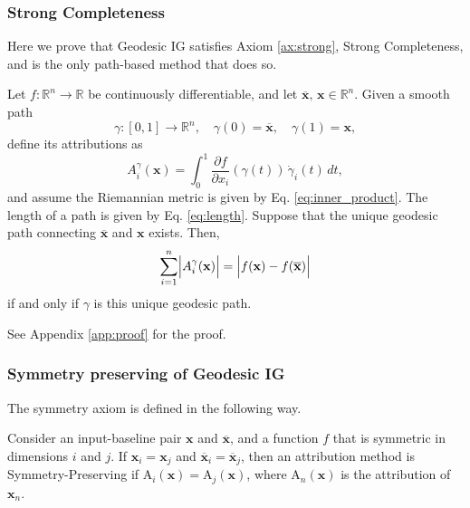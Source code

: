 \subsubsection{Strong Completeness}
\label{sec:strong_comp}

Here we prove that Geodesic IG satisfies Axiom \ref{ax:strong}, Strong Completeness, and is the only path-based method that does so. 

\begin{theorem}
	\label{theo:strong}
	Let \(f:\mathbb{R}^n\to\mathbb{R}\) be continuously differentiable, and let \(\overline{\mathbf{x}},\, \mathbf{x}\in\mathbb{R}^n\). Given a smooth path 
	\[
	\gamma:[0,1]\to\mathbb{R}^n,\quad \gamma(0)=\overline{\mathbf{x}},\quad \gamma(1)=\mathbf{x},
	\]
	define its attributions as
	\begin{equation}
		A_i^{\gamma}(\mathbf{x}) = \int_0^1 \frac{\partial f}{\partial x_i}(\gamma(t))\,\dot{\gamma}_i(t)\,dt,
		\label{eq:attribution}
	\end{equation}
	and assume the Riemannian metric is given by Eq. \ref{eq:inner_product}. 
	The length of a path is given by Eq. \ref{eq:length}. 
	Suppose that the unique geodesic path connecting \(\overline{\mathbf{x}}\) and \(\mathbf{x}\) exists. Then,
	\begin{equation*}
		\sum_{i=1}^n \Bigl| A_i^{\gamma}(\mathbf{x}) \Bigr| = \Bigl| f(\mathbf{x})-f(\overline{\mathbf{x}}) \Bigr|
	\end{equation*}
	if and only if \(\gamma\) is this unique geodesic path.
\end{theorem}


See Appendix \ref{app:proof} for the proof.


\subsubsection{Symmetry preserving of Geodesic IG}

The symmetry axiom is defined in the following way. 
\begin{axiom}
	Consider an input-baseline pair $\textbf{x}$ and $\overline{\textbf{x}}$, and a function $f$ that is symmetric in dimensions $i$ and $j$. If $\textbf{x}_i = \textbf{x}_j$ and $\overline{\textbf{x}}_i = \overline{\textbf{x}}_j$, then an attribution method is Symmetry-Preserving if $\text{A}_i(\textbf{x}) = \text{A}_j(\textbf{x})$, where $\text{A}_n(\textbf{x})$ is the attribution of $\textbf{x}_n$.
\end{axiom}

